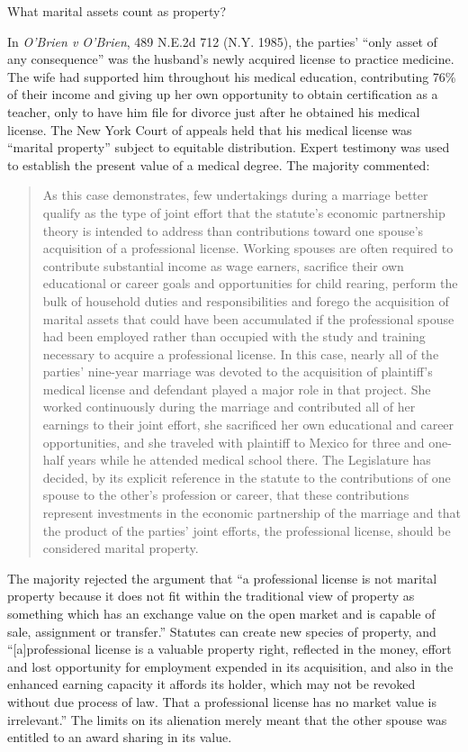 What marital assets count as property?

In \emph{O'Brien v O'Brien}, 489 N.E.2d 712 (N.Y. 1985), the parties' ``only
asset of
any consequence'' was the husband's newly acquired license to practice
medicine. The wife had supported him throughout his medical education,
contributing 76\% of their income and giving up her own opportunity to obtain
certification as a teacher, only to have him file for divorce just after he
obtained his medical license. The New York Court of appeals held that his
medical license was ``marital property'' subject to equitable distribution.
Expert testimony was used to establish the present value of a medical degree.
The majority commented:
\begin{quote}
As this case demonstrates, few undertakings during a marriage better qualify as
the type of joint effort that the statute's economic partnership theory is
intended to address than contributions toward one spouse's acquisition of a
professional license. Working spouses are often required to contribute
substantial income as wage earners, sacrifice their own educational or career
goals and opportunities for child rearing, perform the bulk of household duties
and responsibilities and forego the acquisition of marital assets that could
have been accumulated if the professional spouse had been employed rather than
occupied with the study and training necessary to acquire a professional
license. In this case, nearly all of the parties' nine-year marriage was
devoted to the acquisition of plaintiff's medical license and defendant played
a major role in that project. She worked continuously during the marriage and
contributed all of her earnings to their joint effort, she sacrificed her own
educational and career opportunities, and she traveled with plaintiff to Mexico
for three and one-half years while he attended medical school there. The
Legislature has decided, by its explicit reference in the statute to the
contributions of one spouse to the other's profession or career, that these
contributions represent investments in the economic partnership of the marriage
and that the product of the parties' joint efforts, the professional license,
should be considered marital property.
\end{quote}
The majority rejected the argument that ``a professional license is not marital
property because it does not fit within the traditional view of property as
something which has an exchange value on the open market and is capable of
sale, assignment or transfer.'' Statutes can create new species of property,
and ``[a]professional license is a valuable property right, reflected in the
money, effort and lost opportunity for employment expended in its acquisition,
and also in the enhanced earning capacity it affords its holder, which may not
be revoked without due process of law. That a professional license has no
market value is irrelevant.'' The limits on its alienation merely meant that
the other spouse was entitled to an award sharing in its value.

